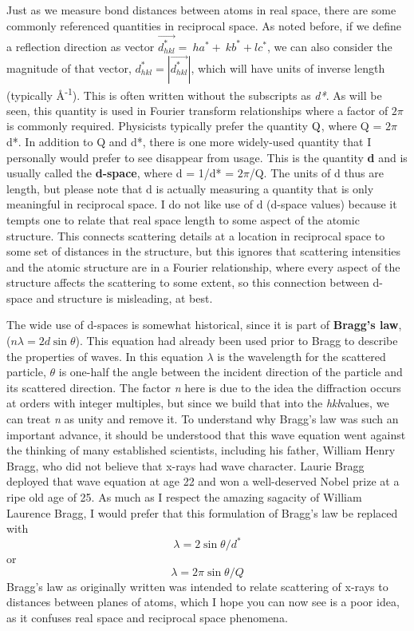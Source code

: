 Just as we measure bond distances between atoms in real space, there are some commonly referenced quantities in reciprocal space. 
As noted before, if we define a reflection direction as vector $\vec{d_{hkl}^\ast}=\ ha^\ast+\ kb^\ast+lc^\ast$, we can also consider the magnitude of that vector, $d_{hkl}^\ast=\left|\vec{d_{hkl}^\ast}\right|$, which will have units of inverse length (typically Å\textsuperscript{-1}). 
This is often written without the subscripts as \textit{d*}. 
As will be seen, this quantity is used in Fourier transform relationships where a factor of $2\pi$ is commonly required. 
Physicists typically prefer the quantity $\rm Q$, where Q = $2\pi $ d*. 
In addition to Q and d*, there is one more widely-used quantity that I personally would prefer to see disappear from usage. 
This is the quantity \textbf{d} and is usually called the \textbf{d-space}, where d = 1/d* = $2\pi$/Q. 
The units of d thus are length, but please note that d is actually measuring a quantity that is only meaningful in reciprocal space. 
I do not like use of d (d-space values) because it tempts one to relate that real space length to  some aspect of the atomic structure. This connects scattering details at a location in reciprocal space to some set of distances in the structure, but this ignores that scattering intensities and the atomic structure are in a Fourier relationship, where every aspect of the structure affects the scattering to some extent, so this connection between d-space and structure is misleading, at best.

The wide use of d-spaces is somewhat historical, since it is part of \textbf{Bragg’s law}, ($n\lambda=2d\sin{\theta}$). This equation had already been used prior to Bragg to describe the properties of waves. In this equation $\lambda$ is the wavelength for the scattered particle, $\theta$ is one-half the angle between the incident direction of the particle and its scattered direction. The factor \textit{n} here is due to the idea the diffraction occurs at orders with integer multiples, but since we build that into the \textit{hkl}values, we can treat \textit{n} as unity and remove it. 
To understand why Bragg’s law was such an important advance, it should be understood that this wave equation went against the thinking of many established scientists, including his father, William Henry Bragg, who did not believe that x-rays had wave character. 
Laurie Bragg deployed that wave equation at age 22 and won a well-deserved Nobel prize at a ripe old age of 25. 
As much as I respect the amazing sagacity of William Laurence Bragg, I would prefer that this formulation of Bragg’s law be replaced with 
$$\lambda={2\sin\theta}/{d^\ast}$$ 
or 
$$\lambda ={2\pi\sin\theta}/Q$$
Bragg’s law as originally written was intended to relate scattering of x-rays to distances between planes of atoms, which I hope you can now see is a poor idea, as it confuses real space and reciprocal space phenomena. 

